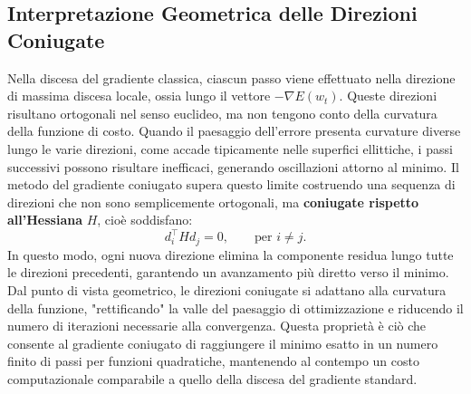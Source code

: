 \subsection{Interpretazione Geometrica delle Direzioni Coniugate}

Nella discesa del gradiente classica, ciascun passo viene effettuato nella direzione di massima discesa locale, ossia lungo il vettore \( -\nabla E(w_t) \). Queste direzioni risultano ortogonali nel senso euclideo, ma non tengono conto della curvatura della funzione di costo. Quando il paesaggio dell'errore presenta curvature diverse lungo le varie direzioni, come accade tipicamente nelle superfici ellittiche, i passi successivi possono risultare inefficaci, generando oscillazioni attorno al minimo. Il metodo del gradiente coniugato supera questo limite costruendo una sequenza di direzioni che non sono semplicemente ortogonali, ma \textbf{coniugate rispetto all'Hessiana} \(H\), cioè soddisfano:
\[
d_i^\top H d_j = 0, \qquad \text{per } i \neq j.
\]
In questo modo, ogni nuova direzione elimina la componente residua lungo tutte le direzioni precedenti, garantendo un avanzamento più diretto verso il minimo. Dal punto di vista geometrico, le direzioni coniugate si adattano alla curvatura della funzione, "rettificando" la valle del paesaggio di ottimizzazione e riducendo il numero di iterazioni necessarie alla convergenza. Questa proprietà è ciò che consente al gradiente coniugato di raggiungere il minimo esatto in un numero finito di passi per funzioni quadratiche, mantenendo al contempo un costo computazionale comparabile a quello della discesa del gradiente standard.